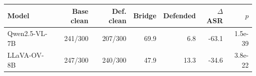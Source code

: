 \begin{tabular}{lrrrrrr}
\toprule
Model & Base clean & Def. clean & Bridge & Defended & $\Delta$ASR & $p$ \\
\midrule
Qwen2.5-VL-7B & 241/300 & 207/300 & 69.9 & 6.8 & -63.1 & 1.5e-39 \\
LLaVA-OV-8B & 247/300 & 240/300 & 47.9 & 13.3 & -34.6 & 3.8e-22 \\
\bottomrule
\end{tabular}
